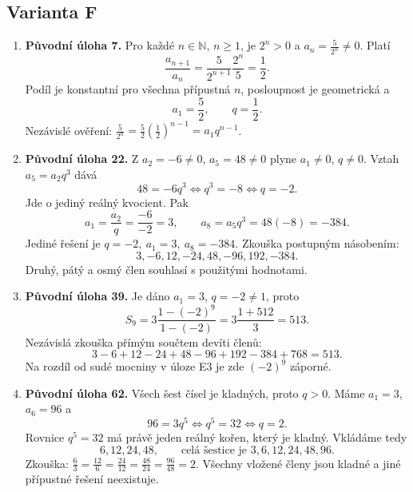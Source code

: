 \documentclass[a4paper,10pt]{article}
\begin{document}
\subsection*{Varianta F}
\begin{enumerate}
\item \textbf{Původní úloha 7.}
Pro každé $n\in\mathbb N$, $n\geq1$, je $2^n>0$ a $a_n=\frac5{2^n}\ne0$.
Platí
\[
\frac{a_{n+1}}{a_n}=\frac{5}{2^{n+1}}\frac{2^n}{5}=\frac12.
\]
Podíl je konstantní pro všechna přípustná $n$, posloupnost je geometrická a
\[
\boxed{a_1=\frac52,\qquad q=\frac12.}
\]
Nezávislé ověření:
$\frac5{2^n}=\frac52\left(\frac12\right)^{n-1}=a_1q^{n-1}$.

\item \textbf{Původní úloha 22.}
Z $a_2=-6\ne0$, $a_5=48\ne0$ plyne $a_1\ne0$, $q\ne0$.
Vztah $a_5=a_2q^3$ dává
\[
48=-6q^3\iff q^3=-8\iff q=-2.
\]
Jde o jediný reálný kvocient. Pak
\[
a_1=\frac{a_2}{q}=\frac{-6}{-2}=3,\qquad
a_8=a_5q^3=48(-8)=-384.
\]
Jediné řešení je $\boxed{q=-2,\ a_1=3,\ a_8=-384}$.
Zkouška postupným násobením:
\[
3,-6,12,-24,48,-96,192,-384.
\]
Druhý, pátý a osmý člen souhlasí s použitými hodnotami.

\item \textbf{Původní úloha 39.}
Je dáno $a_1=3$, $q=-2\ne1$, proto
\[
S_9=3\frac{1-(-2)^9}{1-(-2)}
=3\frac{1+512}{3}=\boxed{513}.
\]
Nezávislá zkouška přímým součtem devíti členů:
\[
3-6+12-24+48-96+192-384+768=513.
\]
Na rozdíl od sudé mocniny v úloze E3 je zde $(-2)^9$ záporné.

\item \textbf{Původní úloha 62.}
Všech šest čísel je kladných, proto $q>0$. Máme $a_1=3$, $a_6=96$ a
\[
96=3q^5\iff q^5=32\iff q=2.
\]
Rovnice $q^5=32$ má právě jeden reálný kořen, který je kladný.
Vkládáme tedy
\[
\boxed{6,12,24,48},\qquad\text{celá šestice je }3,6,12,24,48,96.
\]
Zkouška:
$\frac63=\frac{12}6=\frac{24}{12}=\frac{48}{24}=\frac{96}{48}=2$.
Všechny vložené členy jsou kladné a jiné přípustné řešení neexistuje.
\end{enumerate}

\newpage
\end{document}
